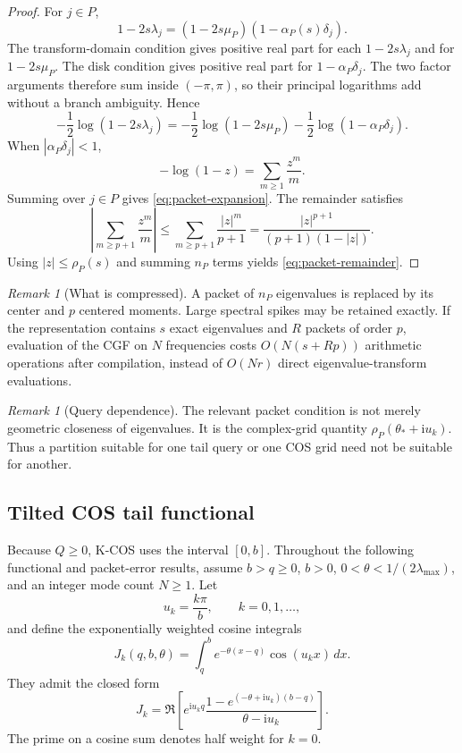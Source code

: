 \documentclass[11pt]{article}
\theoremstyle{definition}
\theoremstyle{remark}
\newtheorem{remark}[theorem]{Remark}
\newcommand{\ii}{\mathrm{i}}
\begin{document}
\begin{proof}
For $j\in P$,
\[
1-2s\lambda_j
=(1-2s\mu_P)(1-\alpha_P(s)\delta_j).
\]
The transform-domain condition gives positive real part for each
\(1-2s\lambda_j\) and for \(1-2s\mu_P\).  The disk condition gives
positive real part for \(1-\alpha_P\delta_j\).  The two factor arguments
therefore sum inside \((-\pi,\pi)\), so their principal logarithms add
without a branch ambiguity.  Hence
\[
-\frac12\log(1-2s\lambda_j)
=-\frac12\log(1-2s\mu_P)
-\frac12\log(1-\alpha_P\delta_j).
\]
When $|\alpha_P\delta_j|<1$,
\[
-\log(1-z)=\sum_{m\ge1}\frac{z^m}{m}.
\]
Summing over $j\in P$ gives \eqref{eq:packet-expansion}. The remainder satisfies
\[
\left|\sum_{m\ge p+1}\frac{z^m}{m}\right|
\le
\sum_{m\ge p+1}\frac{|z|^m}{p+1}
=\frac{|z|^{p+1}}{(p+1)(1-|z|)}.
\]
Using $|z|\le\rho_P(s)$ and summing $n_P$ terms yields \eqref{eq:packet-remainder}.
\end{proof}

\begin{remark}[What is compressed]\label{claim:final-26-3}
A packet of $n_P$ eigenvalues is replaced by its center and $p$ centered moments. Large spectral spikes may be retained exactly. If the representation contains $s$ exact eigenvalues and $R$ packets of order $p$, evaluation of the CGF on $N$ frequencies costs $O(N(s+Rp))$ arithmetic operations after compilation, instead of $O(Nr)$ direct eigenvalue-transform evaluations.
\end{remark}

\begin{remark}[Query dependence]\label{claim:final-26-4}
The relevant packet condition is not merely geometric closeness of eigenvalues. It is the complex-grid quantity $\rho_P(\theta_*+\ii u_k)$. Thus a partition suitable for one tail query or one COS grid need not be suitable for another.
\end{remark}

\subsection{Tilted COS tail functional}

Because $Q\ge0$, K-COS uses the interval $[0,b]$.  Throughout the
following functional and packet-error results, assume $b>q\ge0$, $b>0$,
$0<\theta<1/(2\lambda_{\max})$, and an integer mode count $N\ge1$.  Let
\[
u_k=\frac{k\pi}{b},
\qquad k=0,1,\ldots,
\]
and define the exponentially weighted cosine integrals
\begin{equation}
J_k(q,b,\theta)
=\int_q^b e^{-\theta(x-q)}\cos(u_kx)\,dx.
\label{eq:J-def}
\end{equation}
They admit the closed form
\begin{equation}
J_k
=\Re\left[
 e^{\ii u_k q}
 \frac{1-e^{(-\theta+\ii u_k)(b-q)}}{\theta-\ii u_k}
\right].
\label{eq:J-formula}
\end{equation}
The prime on a cosine sum denotes half weight for $k=0$.
\end{document}
